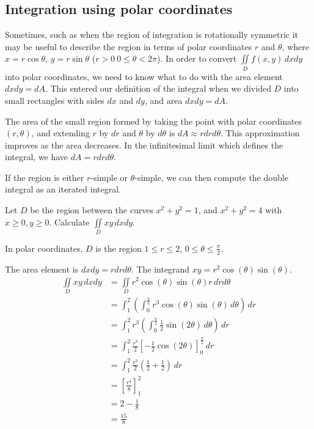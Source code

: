 \documentclass[10pt, a4paper]{article}
\begin{document}
\subsection{Integration using polar coordinates}
Sometimes,
such as when the region of integration is rotationally symmetric it may be useful to describe the region in terms of polar coordinates $r$ and $\theta$,
where
$x = r\cos\theta$, $y = r\sin\theta$ ($r > 0\ 0 \leq \theta < 2\pi$).
In order to convert $\iint\limits_Df(x, y)\,dxdy$ into polar coordinates,
we need to know what to do with the area element $dxdy = dA$.
This entered our definition of the integral when we divided $D$ into small rectangles with sides $dx$ and $dy$,
and area $dxdy = dA$.

The area of the small region formed by taking the point with polar coordinates $(r, \theta)$,
and extending $r$ by $dr$ and $\theta$ by $d\theta$ is $dA \approx rdrd\theta$.
This approximation improves as the area decreases.
In the infinitesimal limit which defines the integral,
we have $dA = rdrd\theta$.

If the region is either $r$-simple or $\theta$-simple,
we can then compute the double integral as an iterated integral.

\begin{example}
    Let $D$ be the region between the curves $x ^ 2 + y ^ 2 = 1$,
    and $x ^ 2 + y ^ 2 = 4$ with $x \geq 0, y \geq 0$.
    Calculate $\iint\limits_Dxy\,dxdy$.

    In polar coordinates,
    $D$ is the region $1 \leq r \leq 2$,
    $0 \leq \theta \leq \frac{\pi}{2}$.

    The area element is $dxdy = rdrd\theta$.
    The integrand $xy = r ^ 2 \cos(\theta)\sin(\theta)$.
    \begin{align*}
        \iint\limits_Dxy\,dxdy &= \iint\limits_Dr ^ 2 \cos(\theta)\sin(\theta)r\,drd\theta \\
        &= \int_1^2\left(\int_0^{\frac{\pi}{2}}r ^ 3 \cos(\theta)\sin(\theta)\,d\theta\right)\,dr \\
        &= \int_1^2r ^ 3 \left(\int_0^{\frac{\pi}{2}}\frac{1}{2}\sin(2\theta)\,d\theta\right)\,dr \\
        &= \int_1^2\frac{r ^ 3}{2}\left[-\frac{1}{2}\cos(2\theta)\right]_0^{\frac{\pi}{2}}\,dr \\
        &= \int_1^2\frac{r ^ 3}{2}\left(\frac{1}{2} + \frac{1}{2}\right)\,dr \\
        &= \left[\frac{r ^ 4}{8}\right]_1^2 \\
        &= 2 - \frac{1}{8} \\
        &= \frac{15}{8}
    \end{align*}
\end{example}
\end{document}
